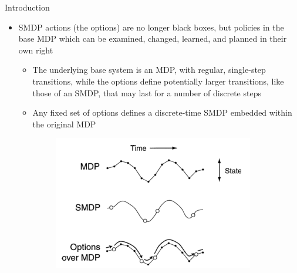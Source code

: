 \begin{frame}{Introduction}
    \begin{itemize}
        \item SMDP actions (the options) are no longer black boxes,  but policies in the base MDP which can be examined, changed, learned, and planned in their own right
        \begin{itemize}
            \item The underlying base system is an MDP, with regular, single-step transitions, while the options define potentially larger transitions, like those of an SMDP, that may last for a number of discrete steps
            \pause
            \item Any fixed set of options defines a discrete-time SMDP embedded within the original MDP
            \begin{figure}
                \centering
                \includegraphics[scale=0.45]{img/options.png}
                \label{fig:options}
            \end{figure}
        \end{itemize}
    \end{itemize}
\end{frame}

